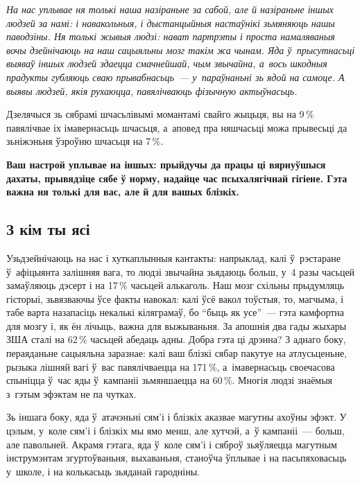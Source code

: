 \emph{На нас уплывае ня толькі наша назіраньне за сабой, але й назіраньне іншых людзей за намі: і навакольныя, і дыстанцыйныя настаўнікі зьмяняюць нашы паводзіны. Ня толькі жывыя людзі: нават партрэты і проста намаляваныя вочы дзейнічаюць на наш сацыяльны мозг такім жа чынам. Яда ў~прысутнасьці выяваў іншых людзей здаецца смачнейшай, чым звычайна, а~вось шкодныя прадукты губляюць сваю прывабнасьць~--- у~параўнаньні зь ядой на самоце. А выявы людзей, якія рухаюцца, павялічваюць фізычную актыўнасьць.}

Дзелячыся зь сябрамі шчасьлівымі момантамі свайго жыцьця, вы на 9\,\% павялічвае іх імавернасьць шчасьця, а~аповед пра няшчасьці можа прывесьці да зьніжэньня ўзроўню шчасьця на 7\,\%.

\textbf{Ваш настрой уплывае на іншых: прыйдучы да працы ці вярнуўшыся дахаты, прывядзіце сябе ў норму, надайце час псыхалягічнай гігіене. Гэта важна ня толькі для вас, але й для вашых блізкіх.}

\subsection*{З кім ты ясі}

Узьдзейнічаюць на нас і хуткаплынныя кантакты: напрыклад, калі ў~рэстаране ў~афіцыянта залішняя вага, то людзі звычайна зьядаюць больш, у~4 разы часьцей замаўляюць дэсерт і на 17\,\% часьцей алькаголь. Наш мозг схільны прыдумляць гісторыі, зьвязваючы ўсе факты навокал: калі ўсё вакол тоўстыя, то, магчыма, і табе варта назапасіць некалькі кіляграмаў, бо ``быць як усе''~--- гэта камфортна для мозгу і, як ён лічыць, важна для выжываньня. За апошнія два гады жыхары ЗША сталі на 62\,\% часьцей абедаць адны. Добра гэта ці дрэнна? З аднаго боку, пераяданьне сацыяльна заразнае: калі ваш блізкі сябар пакутуе на атлусьценьне, рызыка лішняй вагі ў~вас павялічваецца на 171\,\%, а~імавернасьць своечасова спыніцца ў~час яды ў~кампаніі зьмяншаецца на 60\,\%. Многія людзі знаёмыя з~гэтым эфэктам не па чутках.


Зь іншага боку, яда ў~атачэньні сям'і і блізкіх аказвае магутны ахоўны эфэкт. У цэлым, у~коле сям'і і блізкіх мы ямо менш, але хутчэй, а~ў кампаніі~--- больш, але павольней. Акрамя гэтага, яда ў~коле сям'і і сяброў зьяўляецца магутным інструмэнтам згуртоўваньня, выхаваньня, станоўча ўплывае і на пасьпяховасьць у~школе, і на колькасьць зьяданай гародніны.

